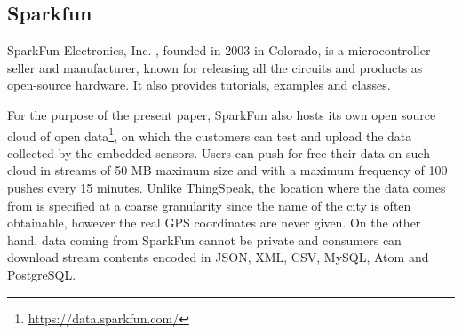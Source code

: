 \subsection{Sparkfun}
SparkFun Electronics, Inc. \cite{sparkfun}, founded in 2003 in Colorado, is a microcontroller seller and manufacturer, known for releasing all the circuits and products as open-source hardware.
It also provides tutorials, examples and classes.

For the purpose of the present paper, SparkFun also hosts its own open source cloud of open data\footnote{\url{https://data.sparkfun.com/}}, on which the customers can test and upload the data collected by the embedded sensors. %
Users can push for free their data on such cloud in streams of 50 MB maximum size and with a maximum frequency of 100 pushes every 15 minutes.
Unlike ThingSpeak, the location where the data comes from is specified at a coarse granularity since the name of the city is often obtainable, however the real GPS coordinates are never given.
On the other hand, data coming from SparkFun cannot be private and consumers can download stream contents encoded in JSON, XML, CSV, MySQL, Atom and PostgreSQL.